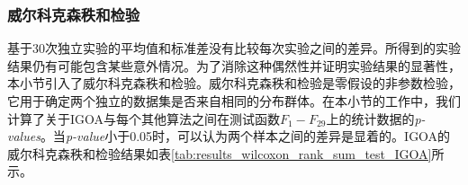 \subsubsection{威尔科克森秩和检验}

基于30次独立实验的平均值和标准差没有比较每次实验之间的差异。所得到的实验结果仍有可能包含某些意外情况。为了消除这种偶然性并证明实验结果的显著性，本小节引入了威尔科克森秩和检验。威尔科克森秩和检验是零假设的非参数检验，它用于确定两个独立的数据集是否来自相同的分布群体。在本小节的工作中，我们计算了关于IGOA与每个其他算法之间在测试函数$F_1-F_{29}$上的统计数据的\emph{p-values}。当\emph{p-value}小于0.05时，可以认为两个样本之间的差异是显着的。IGOA的威尔科克森秩和检验结果如表\ref{tab:results_wilcoxon_rank_sum_test_IGOA}所示。


